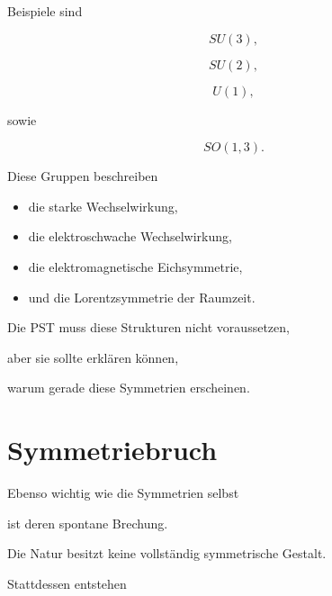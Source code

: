 Beispiele sind

\[
SU(3),
\]

\[
SU(2),
\]

\[
U(1),
\]

sowie

\[
SO(1,3).
\]

Diese Gruppen beschreiben

\begin{itemize}

\item

die starke Wechselwirkung,

\item

die elektroschwache Wechselwirkung,

\item

die elektromagnetische Eichsymmetrie,

\item

und die Lorentzsymmetrie der Raumzeit.

\end{itemize}

Die PST muss diese Strukturen nicht voraussetzen,

aber sie sollte erklären können,

warum gerade diese Symmetrien erscheinen.


\section*{Symmetriebruch}

Ebenso wichtig wie die Symmetrien selbst

ist deren spontane Brechung.

Die Natur besitzt keine vollständig symmetrische Gestalt.

Stattdessen entstehen

